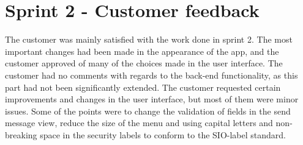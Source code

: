 \section{Sprint 2 - Customer feedback}
The customer was mainly satisfied with the work done in sprint 2. The most important changes had been made in the appearance of the app, and the customer approved of many of the choices made in the user interface. The customer had no comments with regards to the back-end functionality, as this part had not been significantly extended. 
\newline
\newline
The customer requested certain improvements and changes in the user interface, but most of them were minor issues. Some of the points were to change the validation of fields in the send message view, reduce the size of the menu and using capital letters and non-breaking space in the security labels to conform to the SIO-label standard.